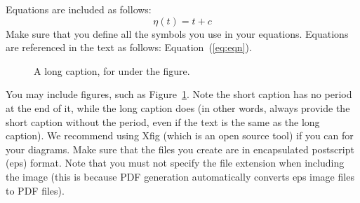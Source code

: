 Equations are included as follows:
\begin{equation}
\label{eq:eqn}
	\eta(t)=t+c
\end{equation}
Make sure that you define all the symbols you use in your equations. Equations are referenced in the text as follows: Equation~(\ref{eq:eqn}).

\begin{figure}
	\caption[A short caption, for the figure list]{A long caption, for under the figure.}
	\label{fig:fig1}
\end{figure}
You may include figures, such as Figure~\ref{fig:fig1}. Note the short caption has no period at the end of it, while the long caption does (in other words, always provide the short caption without the period, even if the text is the same as the long caption). We recommend using Xfig (which is an open source tool) if you can for your diagrams. Make sure that the files you create are in encapsulated postscript (eps) format. Note that you must not specify the file extension when including the image (this is because PDF generation automatically converts eps image files to PDF files).

